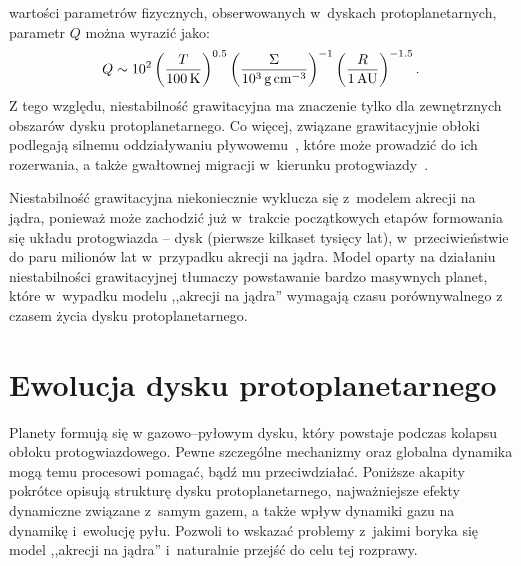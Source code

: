 wartości parametrów fizycznych, obserwowanych w~dyskach protoplanetarnych,
parametr $Q$ można wyrazić jako:
%
\begin{equation}
   Q \sim 10^2 
   \left(\frac{T}{100\hbox{$\thinspace\textrm{K}$}}\right)^{0.5}
   \left(\frac{\Sigma}{10^3\hbox{$\thinspace\textrm{g}$}\hbox{$\thinspace\textrm{cm}$}^{-3}}\right)^{-1}
   \left(\frac{R}{1\hbox{$\thinspace\textrm{AU}$}}\right)^{-1.5}.
   \label{eq:Qemp}
\end{equation}
%
Z tego względu, niestabilność grawitacyjna ma znaczenie tylko dla zewnętrznych
obszarów dysku protoplanetarnego. Co więcej, związane grawitacyjnie obłoki
podlegają silnemu oddziaływaniu pływowemu~\cite{VH12}, które może prowadzić do
ich rozerwania, a także gwałtownej migracji w~kierunku protogwiazdy~\cite{BMP11}.
\par Niestabilność grawitacyjna niekoniecznie wyklucza się z~modelem akrecji na
jądra, ponieważ może zachodzić już w~trakcie początkowych etapów formowania się
układu protogwiazda -- dysk (pierwsze kilkaset tysięcy lat), w~przeciwieństwie
do paru milionów lat w~przypadku akrecji na jądra. Model oparty na działaniu
niestabilności grawitacyjnej tłumaczy powstawanie bardzo masywnych planet, które
w~wypadku modelu ,,akrecji na jądra'' wymagają czasu porównywalnego z czasem
życia dysku protoplanetarnego\cite{HBP13}.

\section{Ewolucja dysku protoplanetarnego}
Planety formują się w gazowo--pyłowym dysku, który powstaje podczas kolapsu
obłoku protogwiazdowego. Pewne szczególne mechanizmy oraz globalna dynamika mogą
temu procesowi pomagać, bądź mu przeciwdziałać. Poniższe akapity pokrótce
opisują strukturę dysku protoplanetarnego, najważniejsze efekty dynamiczne
związane z~samym gazem, a także wpływ dynamiki gazu na dynamikę
i~ewolucję pyłu. Pozwoli to wskazać problemy z~jakimi boryka się model ,,akrecji
na jądra'' i~naturalnie przejść do celu tej rozprawy.


